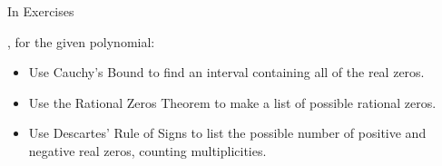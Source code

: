 {\noindent In Exercises}
{, for the given polynomial:

\begin{itemize}
\item  Use Cauchy's Bound to find an interval containing all of the real zeros.
\item  Use the Rational Zeros Theorem to make a list of possible rational zeros.
\item  Use Descartes' Rule of Signs to list the possible number of positive and negative real zeros, counting multiplicities.
\end{itemize}}

